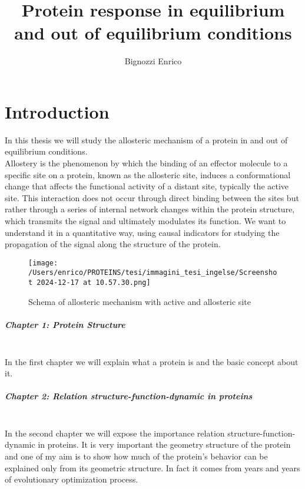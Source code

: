 \documentclass[English, Lau, oneside]{sapthesis}
\title{Protein response in equilibrium and out of equilibrium conditions}
\author{Bignozzi Enrico}
\begin{document}
\maketitle
{}
\tableofcontents



    

\dedication{}

\newpage
\null
\thispagestyle{empty}
\newpage



\chapter*{Introduction}
\noindent In this thesis we will study the allosteric mechanism of a protein in and out of equilibrium conditions.\\
Allostery is the phenomenon by which the binding of an effector molecule to a specific site on a protein, known as the allosteric site, induces a conformational change that affects the functional activity of a distant site, typically the active site. This interaction does not occur through direct binding between the sites but rather through a series of internal network changes within the protein structure, which transmits the signal and ultimately modulates its function.
We want to understand it in a quantitative way, using causal indicators for studying the propagation of the signal along the structure of the protein.
\begin{figure}[H]
    \centering
    \texttt{[image: /Users/enrico/PROTEINS/tesi/immagini\_tesi\_ingelse/Screenshot 2024-12-17 at 10.57.30.png]}
    \caption{Schema of allosteric mechanism with active and allosteric site}
\end{figure}


\paragraph{Chapter 1: Protein Structure} \\
In the first chapter we will explain what a protein is and the basic concept about it.

\paragraph{Chapter 2: Relation structure-function-dynamic in proteins} \\
In the second chapter we will expose the importance relation structure-function-dynamic in proteins. 
It is very important the geometry structure of the protein and one of my aim is to show how much of the protein's behavior can be explained only from its geometric structure.
In fact it comes from years and years of evolutionary optimization process.
\end{document}
